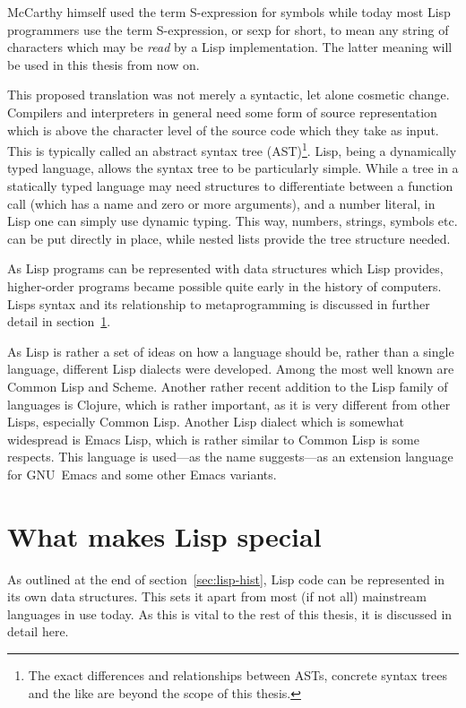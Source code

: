 \documentclass[a4paper,10pt,twoside]{report}
\newcommand{\el}{Emacs Lisp}
\newcommand{\cl}{Common Lisp}
\newcommand{\emacs}{GNU~Emacs}
\begin{document}
McCarthy himself used the term S-expression for symbols while today most Lisp
programmers use the term S-expression, or sexp for short, to mean any string of
characters which may be \emph{read} by a Lisp implementation.  The latter
meaning will be used in this thesis from now on.

This proposed translation was not merely a syntactic, let alone cosmetic change.
Compilers and interpreters in general need some form of source representation
which is above the character level of the source code which they take as input.
This is typically called an abstract syntax tree (AST)\footnote{The exact
  differences and relationships between ASTs, concrete syntax trees and the like
  are beyond the scope of this thesis.}.  Lisp, being a dynamically typed
language, allows the syntax tree to be particularly simple.  While a tree in a
statically typed language may need structures to differentiate between a
function call (which has a name and zero or more arguments), and a number
literal, in Lisp one can simply use dynamic typing.  This way, numbers, strings,
symbols etc. can be put directly in place, while nested lists provide the tree
structure needed.

As Lisp programs can be represented with data structures which Lisp provides,
higher-order programs became possible quite early in the history of computers.
Lisps syntax and its relationship to metaprogramming is discussed in further
detail in section~\ref{sec:lisp-special}.

As Lisp is rather a set of ideas on how a language should be, rather than a
single language, different Lisp dialects were developed.  Among the most well
known are \cl{} and Scheme.  Another rather recent addition to the Lisp family
of languages is Clojure, which is rather important, as it is very different from
other Lisps, especially \cl{}.  Another Lisp dialect which is somewhat
widespread is \el{}, which is rather similar to \cl{} is some respects.  This
language is used---as the name suggests---as an extension language for \emacs{}
and some other Emacs variants.

\section{What makes Lisp special}
\label{sec:lisp-special}

As outlined at the end of section~\ref{sec:lisp-hist}, Lisp code can be
represented in its own data structures.  This sets it apart from most (if not
all) mainstream languages in use today. As this is vital to the rest of this
thesis, it is discussed in detail here.
\end{document}
